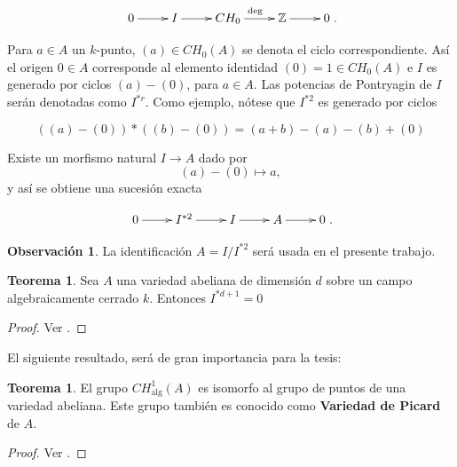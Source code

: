 \documentclass[10pt]{amsart}
\theoremstyle{definition}
\newtheorem{obs}[definition]{Observaci\'on}
\newtheorem{theorem}[definition]{Teorema}
\theoremstyle{remark}
\theoremstyle{definition}
\begin{document}
\begin{equation}
 \xymatrix{ 0 \ar[r] & I \ar[r] & CH_{0} \ar[r]^{\deg} & 
\mathbb{Z} \ar[r] & 0 }.
\end{equation}

Para $a \in A$ un $\mathit{k}$-punto, $(a) \in CH_{0}(A)$ se denota el ciclo correspondiente. Así el origen $0 \in A$ corresponde al elemento identidad $(0)=1 \in CH_{0}(A)$ e $I$ es generado por ciclos $(a)-(0)$, para $a \in A$. Las potencias de Pontryagin de $I$ serán denotadas como $I^{*r}$. Como ejemplo, nótese que $I^{*2}$ es generado por ciclos

\begin{equation*}
((a)-(0))*((b)-(0))=(a+b)-(a)-(b)+(0)
\end{equation*}

Existe un morfismo natural $I \rightarrow A$ dado por
\begin{equation*}
(a)-(0) \mapsto a,
\end{equation*}
y así se obtiene una sucesión exacta

\begin{equation}
 \xymatrix{ 0 \ar[r] & I^{*2} \ar[r] & I \ar[r] & 
A \ar[r] & 0 }.
\end{equation}

\begin{obs} La identificación $A=I/I^{*2}$ será usada en el presente trabajo.
\end{obs}

\begin{theorem}
Sea $A$ una variedad abeliana de dimensión $d$ sobre un campo algebraicamente cerrado $\mathit{k}$. Entonces $I^{*d+1}=0$
\end{theorem}

\begin{proof}
Ver \cite[Thm. 0.1]{B}.
\end{proof}

El siguiente resultado, será de gran importancia para la tesis:
\begin{theorem}
El grupo $CH^{1}_{\mathrm{alg}}(A)$ es isomorfo al grupo de puntos de una variedad abeliana. Este grupo también es conocido como \textbf{Variedad de Picard} de $A$.
\end{theorem}

\begin{proof}
Ver \cite[Thm. 0.2]{B}.
\end{proof}
\end{document}
